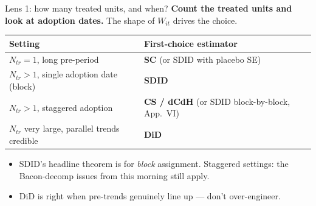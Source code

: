 \documentclass[aspectratio=169,11pt]{beamer}
\begin{document}
\begin{frame}{Lens 1: how many treated units, and when?}
\footnotesize
\textbf{Count the treated units and look at adoption dates.} \;The shape of $W_{it}$ drives the choice.

\vspace{0.4em}
\begin{center}
\renewcommand{\arraystretch}{1.25}
\begin{tabular}{p{} l}
\toprule
\textbf{Setting} & \textbf{First-choice estimator} \\
\midrule
$N_{tr} = 1$, long pre-period & \textbf{SC} (or SDID with placebo SE) \\
$N_{tr} > 1$, single adoption date (block) & \textbf{SDID} \\
$N_{tr} > 1$, staggered adoption & \textbf{CS / dCdH} (or SDID block-by-block, App.\ VI) \\
$N_{tr}$ very large, parallel trends credible & \textbf{DiD} \\
\bottomrule
\end{tabular}
\end{center}

\vspace{0.5em}
\begin{itemize}\setlength\itemsep{2pt}
  \item SDID's headline theorem is for \textit{block} assignment. Staggered settings: the Bacon-decomp issues from this morning still apply.
  \item DiD is right when pre-trends genuinely line up --- don't over-engineer.
\end{itemize}
\end{frame}
\end{document}
